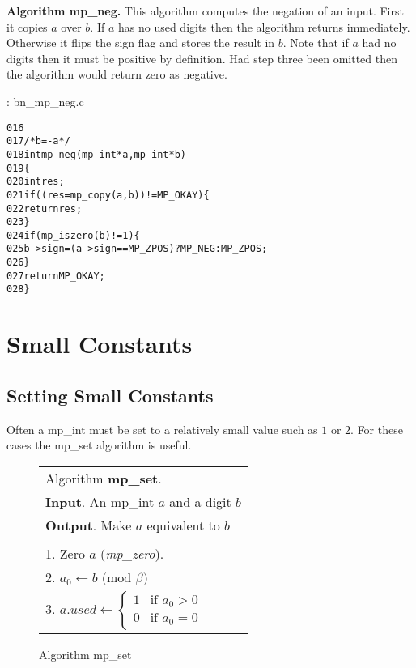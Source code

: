 \documentclass[b5paper]{book}
\begin{document}
\textbf{Algorithm mp\_neg.}
This algorithm computes the negation of an input.  First it copies $a$ over $b$.  If $a$ has no used digits then
the algorithm returns immediately.  Otherwise it flips the sign flag and stores the result in $b$.  Note that if 
$a$ had no digits then it must be positive by definition.  Had step three been omitted then the algorithm would return
zero as negative.

\vspace{+3mm}\begin{small}
\hspace{-5.1mm}{\bf File}: bn\_mp\_neg.c
\vspace{-3mm}
\begin{alltt}
016   
017   /* b = -a */
018   int mp_neg (mp_int * a, mp_int * b)
019   \{
020     int     res;
021     if ((res = mp_copy (a, b)) != MP_OKAY) \{
022       return res;
023     \}
024     if (mp_iszero(b) != 1) \{
025        b->sign = (a->sign == MP_ZPOS) ? MP_NEG : MP_ZPOS;
026     \}
027     return MP_OKAY;
028   \}
\end{alltt}
\end{small}

\section{Small Constants}
\subsection{Setting Small Constants}
Often a mp\_int must be set to a relatively small value such as $1$ or $2$.  For these cases the mp\_set algorithm is useful.

\begin{figure}[here]
\begin{center}
\begin{tabular}{l}
\hline Algorithm \textbf{mp\_set}. \\
\textbf{Input}.   An mp\_int $a$ and a digit $b$ \\
\textbf{Output}.  Make $a$ equivalent to $b$ \\
\hline \\
1.  Zero $a$ (\textit{mp\_zero}). \\
2.  $a_0 \leftarrow b \mbox{ (mod }\beta\mbox{)}$ \\
3.  $a.used \leftarrow  \left \lbrace \begin{array}{ll}
                              1 &  \mbox{if }a_0 > 0 \\
                              0 &  \mbox{if }a_0 = 0 
                              \end{array} \right .$ \\
\hline                              
\end{tabular}
\end{center}
\caption{Algorithm mp\_set}
\end{figure}
\end{document}
